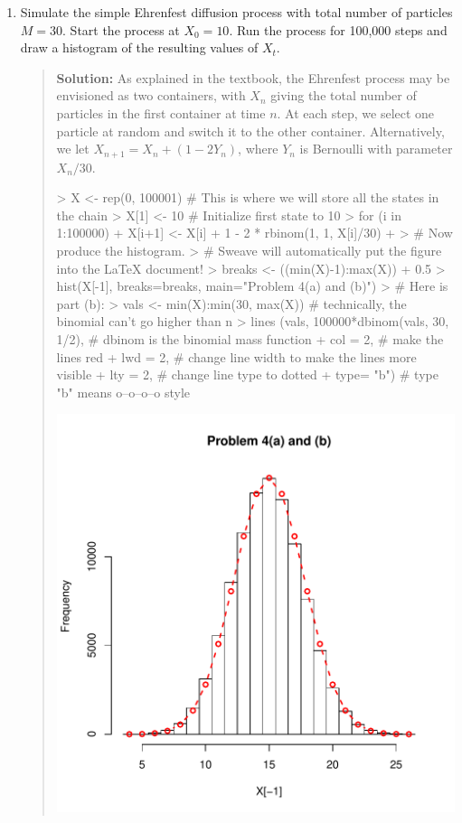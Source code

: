 \documentclass{article}
\begin{document}
\begin{enumerate}
  \begin{enumerate}

  \item Simulate the simple Ehrenfest diffusion process with total number of
  particles $M=30$. Start the process at $X_0=10$. Run the process for 100,000
  steps and draw a histogram of the resulting values of $X_t$.
  \begin{quotation}{\bf Solution:}
  As explained in the textbook, the Ehrenfest process may be envisioned as two 
  containers, with $X_n$ giving the total number of particles in the first container
  at time $n$.  At each step, we select one particle at random and switch it to the
  other container.  Alternatively, we let $X_{n+1}=X_n + (1- 2Y_n)$, where 
  $Y_n$ is Bernoulli with parameter $X_n/30$.
\begin{Schunk}
\begin{Sinput}
> X <- rep(0, 100001) # This is where we will store all the states in the chain
> X[1] <- 10 # Initialize first state to 10
> for (i in 1:100000) {
+   X[i+1] <- X[i] + 1 - 2 * rbinom(1, 1, X[i]/30)
+ }
> # Now produce the histogram.  
> # Sweave will automatically put the figure into the LaTeX document!
> breaks <- ((min(X)-1):max(X)) + 0.5
> hist(X[-1], breaks=breaks, main="Problem 4(a) and (b)") 
> # Here is part (b):
> vals <- min(X):min(30, max(X)) # technically, the binomial can't go higher than n
> lines (vals, 100000*dbinom(vals, 30, 1/2), # dbinom is the binomial mass function
+        col = 2, # make the lines red
+        lwd = 2, # change line width to make the lines more visible
+        lty = 2, # change line type to dotted
+        type= "b") # type "b" means o--o--o--o style
\end{Sinput}
\end{Schunk}
\includegraphics{sol04-006}
  \end{quotation}


\end{enumerate}
\end{enumerate}
\end{document}

